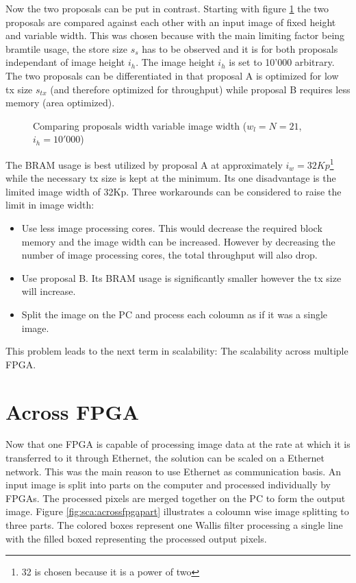 Now the two proposals can be put in contrast. Starting with figure 
\ref{fig:sca:compfixheight} the two proposals are compared against each other
with an input image of fixed height and variable width. This was chosen because
with the main limiting factor being \gls{bramtile} usage, the store size $s_s$ has to
be observed and it is for both proposals independant of image height $i_h$.
The image height $i_h$ is set to 10'000 arbitrary. The
two proposals can be differentiated in that proposal A is optimized for low tx
size $s_{tx}$ (and therefore optimized for throughput) while proposal B requires
less memory (area optimized). 

\begin{figure}[b!]
    \centering
    \begin{adjustbox}{max width=\linewidth}
        
    \end{adjustbox}
    \caption{Comparing proposals width variable image width ($w_l=N=21$,
    $i_h=10'000$)}
    \label{fig:sca:compfixheight}
\end{figure}

\clearpage
The BRAM usage is best utilized by proposal A at approximately
$i_w=32Kp$\footnote{32 is chosen because it is a power of two} while
the necessary tx size is kept at the minimum. Its one disadvantage is the
limited image width of 32Kp. Three workarounds can be considered to raise the
limit in image width:
\begin{itemize}
    \item Use less image processing cores. This would decrease the required
    block memory and the image width can be increased. However by decreasing the
    number of image processing cores, the total throughput will also drop.
    \item Use proposal B. Its BRAM usage is significantly smaller however the tx
    size will increase.
    \item Split the image on the PC and process each coloumn as if it was a
    single image.
\end{itemize}

This problem leads to the next term in scalability: The scalability across
multiple FPGA.


\section{Across FPGA}
Now that one FPGA is capable of processing image data at the rate at which it is
transferred to it through Ethernet, the solution can be scaled on a Ethernet
network. This
was the main reason to use Ethernet as communication basis. An input image is
split into parts on the computer and processed individually by FPGAs. The
processed pixels are merged together on the PC to form the output image. Figure
\ref{fig:sca:acrossfpgapart} illustrates a coloumn wise image splitting to three
parts. The colored boxes represent one Wallis filter processing a single line
with the filled boxed representing the processed output pixels.

